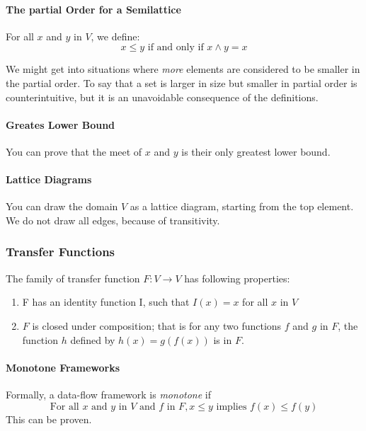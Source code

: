 \documentclass{article}
\begin{document}
\paragraph{The partial Order for a Semilattice} %
\label{par:The partial Order for a Semilattice}
For all $x$ and $y$ in $V$, we define:
\begin{equation}
	x \le y \mbox{ if and only if } x \wedge y = x
\end{equation}

We might get into situations where \emph{more} elements are considered to be smaller in the partial order. To say that a set is larger in size but smaller in partial order is counterintuitive, but it is an unavoidable consequence of the definitions.

\paragraph{Greates Lower Bound} %
\label{par:Greates Lower Bound}
You can prove that the meet of $x$ and $y$ is their only greatest lower bound.

\paragraph{Lattice Diagrams} %
\label{par:Lattice Diagrams}
You can draw the domain $V$ as a lattice diagram, starting from the top element. We do not draw all edges, because of transitivity.


\subsubsection{Transfer Functions} %
\label{ssub:Transfer Functions}
The family of transfer function $F : V \to V$ has following properties:
\begin{enumerate}
	\item F has an identity function I, such that $I(x) = x$ for all $x$ in $V$
	\item $F$ is closed under composition; that is for any two functions $f$ and $g$ in $F$, the function $h$ defined by $h(x) = g(f(x))$ is in $F$.
\end{enumerate}

\paragraph{Monotone Frameworks} %
\label{par:Monotone Frameworks}
Formally, a data-flow framework is \emph{monotone} if
\begin{equation}
	\label{eq:monotone1}
	\mbox{For all } x \mbox{ and } y \mbox{ in } V \mbox{ and } f \mbox{ in } F, x \le y \mbox{ implies } f(x) \le f(y)
\end{equation}
This can be proven.
\end{document}
